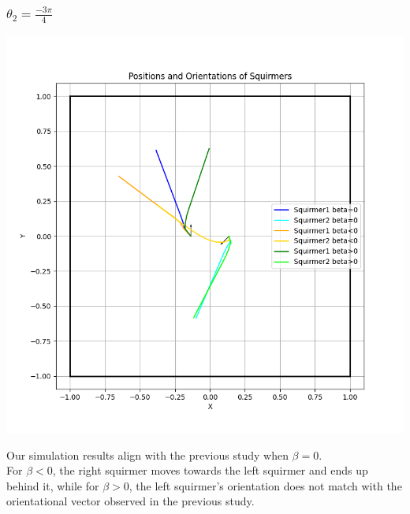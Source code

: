 \documentclass{article}
\begin{document}
\subsubsection{$\theta_2 = \frac{-3\pi}{4}$}
\begin{center}
   \includegraphics[width=1\textwidth]{graphs/simulations/twosquirmerinter/sq2.-3pi.4.png}
\end{center}
Our simulation results align with the previous study when $\beta = 0$.\\
For $\beta < 0$, the right squirmer moves towards the left squirmer and ends up behind it,
 while for $\beta > 0$, the left squirmer's orientation does not match with the 
 orientational vector observed in the previous study.\\
\end{document}
